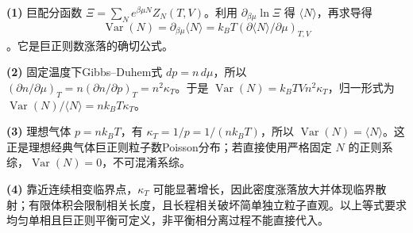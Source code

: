 \par\noindent\textbf{(1)} 巨配分函数 \(\Xi=\sum_N e^{\beta\mu N}Z_N(T,V)\)。利用 \(\partial_{\beta\mu}\ln\Xi\) 得 \(\langle N\rangle\)，再求导得 \[\operatorname{Var}(N)=\partial_{\beta\mu}\langle N\rangle=k_BT(\partial\langle N\rangle/\partial\mu)_{T,V}\]。它是巨正则数涨落的确切公式。
\par\noindent\textbf{(2)} 固定温度下Gibbs–Duhem式 \(dp=n\,d\mu\)，所以 \((\partial n/\partial\mu)_T=n(\partial n/\partial p)_T=n^2\kappa_T\)。于是 \(\operatorname{Var}(N)=k_BTVn^2\kappa_T\)，归一形式为 \(\operatorname{Var}(N)/\langle N\rangle=nk_BT\kappa_T\)。
\par\noindent\textbf{(3)} 理想气体 \(p=nk_BT\)，有 \(\kappa_T=1/p=1/(nk_BT)\)，所以 \(\operatorname{Var}(N)=\langle N\rangle\)。这正是理想经典气体巨正则粒子数Poisson分布；若直接使用严格固定 \(N\) 的正则系综，\(\operatorname{Var}(N)=0\)，不可混淆系综。
\par\noindent\textbf{(4)} 靠近连续相变临界点，\(\kappa_T\) 可能显著增长，因此密度涨落放大并体现临界散射；有限体积会限制相关长度，且长程相关破坏简单独立粒子直观。以上等式要求均匀单相且巨正则平衡可定义，非平衡相分离过程不能直接代入。
